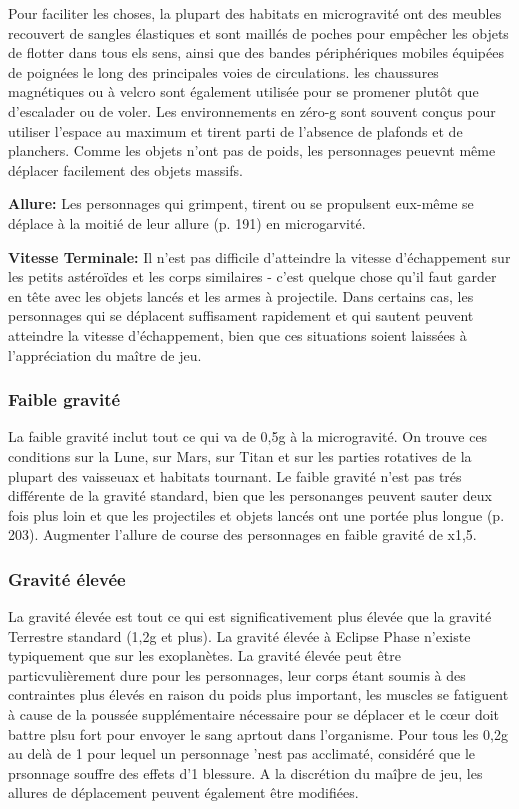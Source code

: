Pour faciliter les choses, la plupart des habitats en microgravité ont des meubles recouvert de sangles élastiques et sont maillés de poches pour empêcher les objets de flotter dans tous els sens, ainsi que des bandes périphériques mobiles équipées de poignées le long des principales voies de circulations. les chaussures magnétiques ou à velcro sont également utilisée pour se promener plutôt que d'escalader ou de voler. Les environnements en zéro-g sont souvent conçus pour utiliser l'espace au maximum et tirent parti de l'absence de plafonds et de planchers. Comme les objets n'ont pas de poids, les personnages peuevnt même déplacer facilement des objets massifs. 

\textbf{Allure:} Les personnages qui grimpent, tirent ou se propulsent eux-même se déplace à la moitié de leur allure (p. 191) en microgarvité. 

\textbf{Vitesse Terminale:} Il n'est pas difficile d'atteindre la vitesse d'échappement sur les petits astéroïdes et les corps similaires - c'est quelque chose qu'il faut garder en tête avec les objets lancés et les armes à projectile. Dans certains cas, les personnages qui se déplacent suffisament rapidement et qui sautent peuvent atteindre la vitesse d'échappement, bien que ces situations soient laissées à l'appréciation du maître de jeu. 

\subsubsection{Faible gravité} 

La faible gravité inclut tout ce qui va de 0,5g à la microgravité. On trouve ces conditions sur la Lune, sur Mars, sur Titan et sur les parties rotatives de la plupart des vaisseuax et habitats tournant. Le faible gravité n'est pas trés différente de la gravité standard, bien que les personanges peuvent sauter deux fois plus loin et que les projectiles et objets lancés ont une portée plus longue (p. 203). Augmenter l'allure de course des personnages en faible gravité de x1,5. 

\subsubsection{Gravité élevée} 

La gravité élevée est tout ce qui est significativement plus élevée que la gravité Terrestre standard (1,2g et plus). La gravité élevée à Eclipse Phase n'existe typiquement que sur les exoplanètes. La gravité élevée peut être particvulièrement dure pour les personnages, leur corps étant soumis à des contraintes plus élevés en raison du poids plus important, les muscles se fatiguent à cause de la poussée supplémentaire nécessaire pour se déplacer et le cœur doit battre plsu fort pour envoyer le sang aprtout dans l'organisme. Pour tous les 0,2g au delà de 1 pour lequel un personnage 'nest pas acclimaté, considéré que le prsonnage souffre des effets d'1 blessure. A la discrétion du maîþre de jeu, les allures de déplacement peuvent également être modifiées. 


